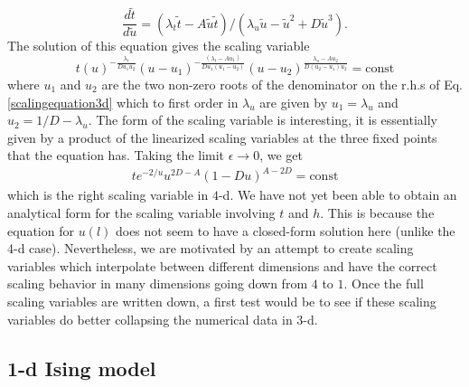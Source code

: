 \documentclass[
 reprint,
 amsmath,amssymb,
 aps, superscriptaddress, pre
]{revtex4-1}
\begin{document}
\begin{equation}
 \frac{d \tilde t}{d \tilde u} = (\lambda_t \tilde{t} - A \tilde{u} \tilde{t})/(\lambda_u \tilde{u} - \tilde{u}^2 + D \tilde{u}^3) .
 \label{scalingequation3d}
\end{equation}
The solution of this equation gives the scaling variable
\begin{equation}
 t (u)^{-\frac{\lambda_t}{D u_1 u_2}} (u - u_1)^{-\frac{(\lambda_t - A u_1)}{D u_1 (u_1 - u_2)}} (u - u_2)^{\frac{\lambda_u - A u_2}{D (u_2 - u_1) u_2}} = \textrm{const} 
 \label{scaling3d}
\end{equation}
where $u_1$ and $u_2$ are the two non-zero roots of the denominator on the r.h.s of Eq.\ref{scalingequation3d} which to first order in $\lambda_u$ are given by $u_1 = \lambda_u$ and $u_2 = 1/D - \lambda_u$. The form of the scaling variable is interesting, it is essentially given by a product of the linearized scaling variables at the three fixed points that the equation has. Taking the limit $\epsilon \rightarrow 0$, we get 
\begin{align}
 t e^{-2/u} u^{2 D - A} (1 - D u)^{A-2 D} = \textrm{const}
\end{align}
which is the right scaling variable in $4$-d. We have not yet been able to obtain an analytical form for the scaling variable involving $t$ and $h$. This is because the equation for $u(l)$ does not seem to have a closed-form solution here (unlike the 4-d case). Nevertheless, we are motivated by an attempt to create scaling variables which interpolate between different dimensions and have the correct scaling behavior in many dimensions going down from $4$ to $1$. Once the full scaling variables are written down, a first test would be to see if these scaling variables do better collapsing the numerical data in 3-d. 


\subsection{1-d Ising model} \label{sec:1dising}
\end{document}
